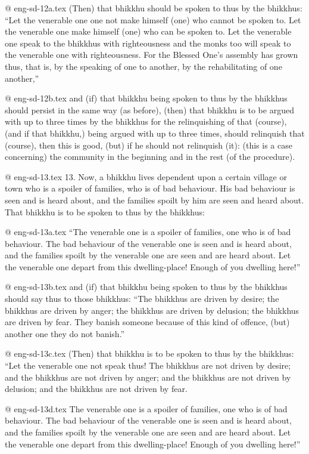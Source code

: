 @ eng-sd-12a.tex
(Then) that bhikkhu should be spoken to thus by the bhikkhus: “Let the venerable one one not make himself (one) who cannot be spoken to. Let the venerable one make himself (one) who can be spoken to. Let the venerable one speak to the bhikkhus with righteousness and the monks too will speak to the venerable one with righteousness. For the Blessed One's assembly has grown thus, that is, by the speaking of one to another, by the rehabilitating of one another,”

@ eng-sd-12b.tex
and (if) that bhikkhu being spoken to thus by the bhikkhus should persist in the same way (as before), (then) that bhikkhu is to be argued with up to three times by the bhikkhus for the relinquishing of that (course), (and if that bhikkhu,) being argued with up to three times, should relinquish that (course), then this is good, (but) if he should not relinquish (it): (this is a case concerning) the community in the beginning and in the rest (of the procedure).

@ eng-sd-13.tex
13. Now, a bhikkhu lives dependent upon a certain village or town who is a spoiler of families, who is of bad behaviour. His bad behaviour is seen and is heard about, and the families spoilt by him are seen and heard about. That bhikkhu is to be spoken to thus by the bhikkhus:

@ eng-sd-13a.tex
“The venerable one is a spoiler of families, one who is of bad behaviour. The bad behaviour of the venerable one is seen and is heard about, and the families spoilt by the venerable one are seen and are heard about. Let the venerable one depart from this dwelling-place! Enough of you dwelling here!”

@ eng-sd-13b.tex
and (if) that bhikkhu being spoken to thus by the bhikkhus should say thus to those bhikkhus: “The bhikkhus are driven by desire; the bhikkhus are driven by anger; the bhikkhus are driven by delusion; the bhikkhus are driven by fear. They banish someone because of this kind of offence, (but) another one they do not banish.”

@ eng-sd-13c.tex
(Then) that bhikkhu is to be spoken to thus by the bhikkhus: “Let the venerable one not speak thus! The bhikkhus are not driven by desire; and the bhikkhus are not driven by anger; and the bhikkhus are not driven by delusion; and the bhikkhus are not driven by fear.

@ eng-sd-13d.tex
The venerable one is a spoiler of families, one who is of bad behaviour. The bad  behaviour  of  the venerable  one  is  seen and  is  heard  about,  and  the families   spoilt  by the venerable  one are seen and are heard  about.  Let  the venerable  one  depart  from  this  dwelling-place! Enough of you dwelling here!”

